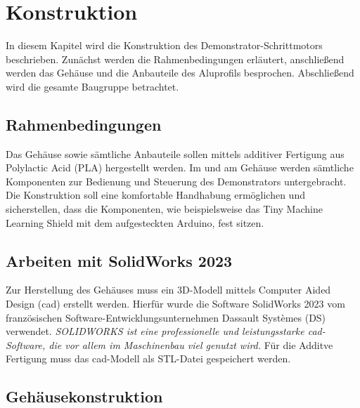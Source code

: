 %
%
%

\chapter{Konstruktion}

In diesem Kapitel wird die Konstruktion des Demonstrator-Schrittmotors beschrieben. Zunächst werden die Rahmenbedingungen erläutert, anschließend werden das Gehäuse und die Anbauteile des Aluprofils besprochen. Abschließend wird die gesamte Baugruppe betrachtet.

\section{Rahmenbedingungen}

Das Gehäuse sowie sämtliche Anbauteile sollen mittels additiver Fertigung aus Polylactic Acid (PLA) hergestellt werden. Im und am Gehäuse werden sämtliche Komponenten zur Bedienung und Steuerung des Demonstrators untergebracht. Die Konstruktion soll eine komfortable Handhabung ermöglichen und sicherstellen, dass die Komponenten, wie beispielsweise das Tiny Machine Learning Shield mit dem aufgesteckten Arduino, fest sitzen.

\section{Arbeiten mit SolidWorks 2023}

Zur Herstellung des Gehäuses muss ein 3D-Modell mittels Computer Aided Design (\ac{cad}) erstellt werden. Hierfür wurde die Software SolidWorks 2023 vom französischen Software-Entwicklungsunternehmen Dassault Systèmes (DS) verwendet. \glqq \textit{SOLIDWORKS ist eine professionelle und leistungsstarke \ac{cad}-Software, die vor allem im Maschinenbau viel genutzt wird.}\grqq \cite[S.225]{Weber.2024} Für die Additve Fertigung muss das \ac{cad}-Modell als STL-Datei gespeichert werden. 

\section{Gehäusekonstruktion}

